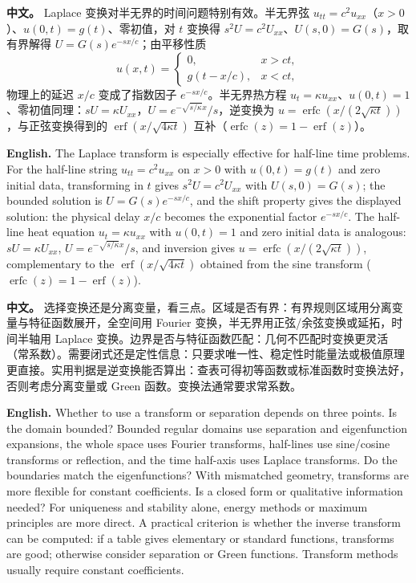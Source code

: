 \documentclass[UTF8,11pt,a4paper]{ctexart}
\newcommand{\APS}[2]{\par\noindent\textbf{中文。} #1\par\noindent\textbf{English.} #2\par\smallskip}
\begin{document}
\APS{Laplace 变换对半无界的时间问题特别有效。半无界弦 $u_{tt}=c^2u_{xx}$（$x>0$）、$u(0,t)=g(t)$、零初值，对 $t$ 变换得 $s^2U=c^2U_{xx}$、$U(s,0)=G(s)$，取有界解得 $U=G(s)e^{-sx/c}$；由平移性质
\[
u(x,t)=\begin{cases}0,&x>ct,\\g(t-x/c),&x<ct,\end{cases}
\]
物理上的延迟 $x/c$ 变成了指数因子 $e^{-sx/c}$。半无界热方程 $u_t=\kappa u_{xx}$、$u(0,t)=1$、零初值同理：$sU=\kappa U_{xx}$，$U=e^{-\sqrt{s/\kappa}x}/s$，逆变换为 $u=\operatorname{erfc}(x/(2\sqrt{\kappa t}))$，与正弦变换得到的 $\operatorname{erf}(x/\sqrt{4\kappa t})$ 互补（$\operatorname{erfc}(z)=1-\operatorname{erf}(z)$）。}{The Laplace transform is especially effective for half-line time problems. For the half-line string $u_{tt}=c^2u_{xx}$ on $x>0$ with $u(0,t)=g(t)$ and zero initial data, transforming in $t$ gives $s^2U=c^2U_{xx}$ with $U(s,0)=G(s)$; the bounded solution is $U=G(s)e^{-sx/c}$, and the shift property gives the displayed solution: the physical delay $x/c$ becomes the exponential factor $e^{-sx/c}$. The half-line heat equation $u_t=\kappa u_{xx}$ with $u(0,t)=1$ and zero initial data is analogous: $sU=\kappa U_{xx}$, $U=e^{-\sqrt{s/\kappa}x}/s$, and inversion gives $u=\operatorname{erfc}(x/(2\sqrt{\kappa t}))$, complementary to the $\operatorname{erf}(x/\sqrt{4\kappa t})$ obtained from the sine transform ($\operatorname{erfc}(z)=1-\operatorname{erf}(z)$).}
\APS{选择变换还是分离变量，看三点。区域是否有界：有界规则区域用分离变量与特征函数展开，全空间用 Fourier 变换，半无界用正弦/余弦变换或延拓，时间半轴用 Laplace 变换。边界是否与特征函数匹配：几何不匹配时变换更灵活（常系数）。需要闭式还是定性信息：只要求唯一性、稳定性时能量法或极值原理更直接。实用判据是逆变换能否算出：查表可得初等函数或标准函数时变换法好，否则考虑分离变量或 Green 函数。变换法通常要求常系数。}{Whether to use a transform or separation depends on three points. Is the domain bounded? Bounded regular domains use separation and eigenfunction expansions, the whole space uses Fourier transforms, half-lines use sine/cosine transforms or reflection, and the time half-axis uses Laplace transforms. Do the boundaries match the eigenfunctions? With mismatched geometry, transforms are more flexible for constant coefficients. Is a closed form or qualitative information needed? For uniqueness and stability alone, energy methods or maximum principles are more direct. A practical criterion is whether the inverse transform can be computed: if a table gives elementary or standard functions, transforms are good; otherwise consider separation or Green functions. Transform methods usually require constant coefficients.}
\end{document}
